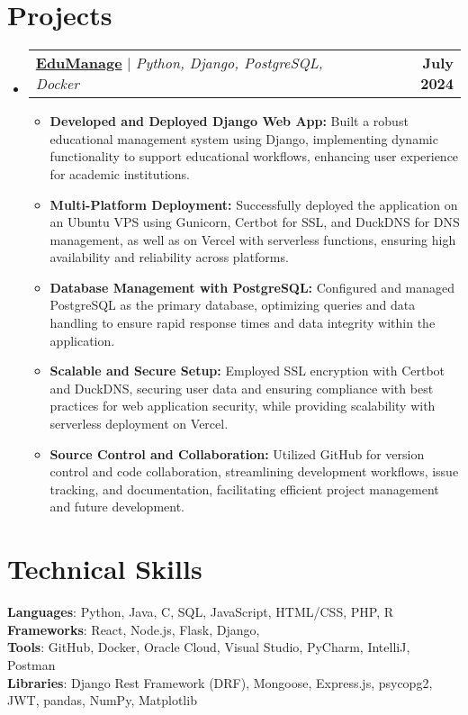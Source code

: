 \documentclass[a4paper,11pt]{article}
\makeatletter
\newcommand{\resumeItem}[1]{
  \item\small{#1 \vspace{-2pt}}
}
\newcommand{\resumeProjectHeading}[2]{
    \item
    \begin{tabular*}{0.97\textwidth}{l@{\extracolsep{\fill}}r}
      \small#1 & \textbf{\small #2} \\
    \end{tabular*}\vspace{-7pt}
}
\newcommand{\resumeSubHeadingListStart}{\begin{itemize}[leftmargin=0.15in, label={}]}
\newcommand{\resumeSubHeadingListEnd}{\end{itemize}}
\newcommand{\resumeItemListStart}{\begin{itemize}}
\newcommand{\resumeItemListEnd}{\end{itemize}\vspace{-5pt}}
\makeatother
\begin{document}
\section{Projects}
\resumeSubHeadingListStart
  \resumeProjectHeading
    {\textbf{\href{https://github.com/ajmalbuv/EduManage}{EduManage}} $|$ \emph{Python, Django, PostgreSQL, Docker}}{July 2024}
    \resumeItemListStart
      \resumeItem{\textbf{Developed and Deployed Django Web App:} Built a robust educational management system using Django, implementing dynamic functionality to support educational workflows, enhancing user experience for academic institutions.}
      \resumeItem{\textbf{Multi-Platform Deployment:} Successfully deployed the application on an Ubuntu VPS using Gunicorn, Certbot for SSL, and DuckDNS for DNS management, as well as on Vercel with serverless functions, ensuring high availability and reliability across platforms.}
      \resumeItem{\textbf{Database Management with PostgreSQL:} Configured and managed PostgreSQL as the primary database, optimizing queries and data handling to ensure rapid response times and data integrity within the application.}
      \resumeItem{\textbf{Scalable and Secure Setup:} Employed SSL encryption with Certbot and DuckDNS, securing user data and ensuring compliance with best practices for web application security, while providing scalability with serverless deployment on Vercel.}
      \resumeItem{\textbf{Source Control and Collaboration:} Utilized GitHub for version control and code collaboration, streamlining development workflows, issue tracking, and documentation, facilitating efficient project management and future development.}
    \resumeItemListEnd
\resumeSubHeadingListEnd

\section{Technical Skills}
\begin{itemize}[leftmargin=0.15in, label={}]
  \small{\item{
   \textbf{Languages}{: Python, Java, C, SQL, JavaScript, HTML/CSS, PHP, R} \\
   \textbf{Frameworks}{: React, Node.js, Flask, Django, } \\
   \textbf{Tools}{: GitHub, Docker, Oracle Cloud, Visual Studio, PyCharm, IntelliJ, Postman} \\
   \textbf{Libraries}{: Django Rest Framework (DRF), Mongoose, Express.js, psycopg2, JWT, pandas, NumPy, Matplotlib}
  }}
\end{itemize}
\end{document}
